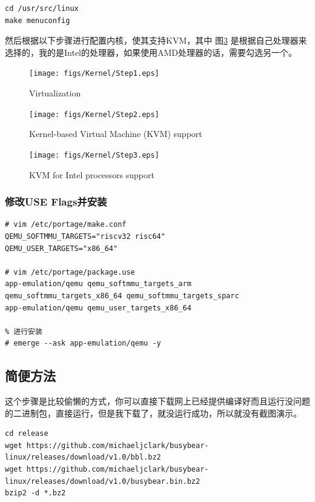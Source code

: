 \begin{lstlisting}
cd /usr/src/linux
make menuconfig 
\end{lstlisting}

然后根据以下步骤进行配置内核，使其支持KVM，其中 图\ref{fig:KVM_Intel} 是根据自己处理器来选择的，我的是Intel的处理器，如果使用AMD处理器的话，需要勾选另一个。

\begin{figure}[htbp]
  \centering %
  \texttt{[image: figs/Kernel/Step1.eps]}
  \caption{Virtualization}
  \label{fig:Virtualization} %
\end{figure}

\begin{figure}[htbp]
  \centering %
  \texttt{[image: figs/Kernel/Step2.eps]}
  \caption{Kernel-based Virtual Machine (KVM) support}
  \label{fig:Kernel-based} %
\end{figure}

\begin{figure}[htbp]
  \centering %
  \texttt{[image: figs/Kernel/Step3.eps]}
  \caption{KVM for Intel processors support}
  \label{fig:KVM_Intel} %
\end{figure}

\subsubsection{修改USE Flags并安装}
\begin{lstlisting}
# vim /etc/portage/make.conf
QEMU_SOFTMMU_TARGETS="riscv32 risc64"
QEMU_USER_TARGETS="x86_64"

# vim /etc/portage/package.use
app-emulation/qemu qemu_softmmu_targets_arm qemu_softmmu_targets_x86_64 qemu_softmmu_targets_sparc
app-emulation/qemu qemu_user_targets_x86_64

% 进行安装
# emerge --ask app-emulation/qemu -y
\end{lstlisting}

\subsection{简便方法}
这个步骤是比较偷懒的方式，你可以直接下载网上已经提供编译好而且运行没问题的二进制包，直接运行，但是我下载了，就没运行成功，所以就没有截图演示。
\begin{lstlisting}
cd release
wget https://github.com/michaeljclark/busybear-linux/releases/download/v1.0/bbl.bz2
wget https://github.com/michaeljclark/busybear-linux/releases/download/v1.0/busybear.bin.bz2
bzip2 -d *.bz2
\end{lstlisting}

